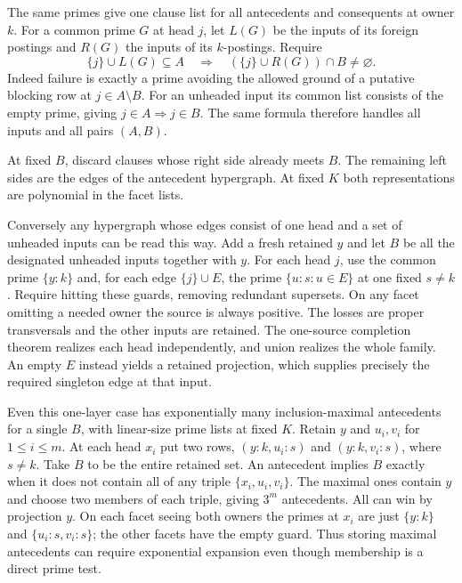 The same primes give one clause list for all
antecedents and consequents at owner $k$. For a
common prime $G$ at head $j$, let $L(G)$ be the
inputs of its foreign postings and $R(G)$ the
inputs of its $k$-postings. Require
\[
 \{j\}\cup L(G)\subseteq A
 \quad\Longrightarrow\quad
 (\{j\}\cup R(G))\cap B\ne\varnothing .
\]
Indeed failure is exactly a prime avoiding the
allowed ground of a putative blocking row at
$j\in A\setminus B$. For an unheaded input its
common list consists of the empty prime, giving
$j\in A\Rightarrow j\in B$. The same formula
therefore handles all inputs and all pairs $(A,B)$.

At fixed $B$, discard clauses whose right side
already meets $B$. The remaining left sides
are the edges of the antecedent hypergraph.
At fixed $K$ both representations are polynomial
in the facet lists.

Conversely any hypergraph whose edges consist of
one head and a set of unheaded inputs can be read
this way. Add a fresh retained $y$ and let $B$ be
all the designated unheaded inputs together with $y$.
For each head $j$, use the common prime
$\{y{:}k\}$ and, for each edge $\{j\}\cup E$,
the prime $\{u{:}s:u\in E\}$ at one fixed $s\ne k$.
Require hitting these guards, removing redundant
supersets. On any facet omitting a needed owner
the source is always positive. The losses are
proper transversals and the other inputs are retained.
The one-source completion theorem realizes
each head independently, and union realizes
the whole family. An empty $E$ instead yields
a retained projection, which supplies precisely
the required singleton edge at that input.

Even this one-layer case has exponentially many
inclusion-maximal antecedents for a single $B$,
with linear-size prime lists at fixed $K$.
Retain $y$ and $u_i,v_i$ for $1\le i\le m$.
At each head $x_i$ put two rows,
$(y{:}k,u_i{:}s)$ and $(y{:}k,v_i{:}s)$,
where $s\ne k$. Take $B$ to be the entire retained
set. An antecedent implies $B$ exactly when it does
not contain all of any triple $\{x_i,u_i,v_i\}$.
The maximal ones contain $y$ and choose two
members of each triple, giving $3^m$ antecedents.
All can win by projection $y$. On each facet
seeing both owners the primes at $x_i$ are just
$\{y{:}k\}$ and $\{u_i{:}s,v_i{:}s\}$; the other
facets have the empty guard. Thus storing maximal
antecedents can require exponential expansion
even though membership is a direct prime test.

